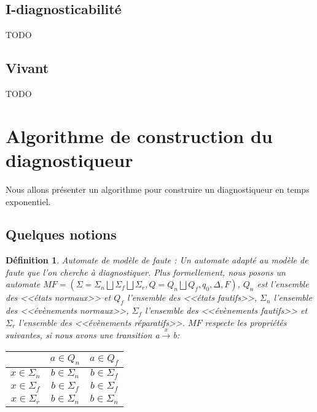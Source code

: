 \documentclass[10pt,a4paper]{article}
\newtheorem {mydef} {D\'efinition}
\begin{document}
\subsection{I-diagnosticabilit\'e}

TODO

\subsection{Vivant}

TODO

\section{Algorithme de construction du diagnostiqueur}
    Nous allons présenter un algorithme pour construire un diagnostiqueur en temps exponentiel.
        \subsection{Quelques notions}
   \begin{mydef}{Automate de mod\`ele de faute : }
                Un automate adapté au modèle de faute que l'on cherche à diagnostiquer. Plus formellement, nous posons un automate $MF = (\Sigma = \Sigma_n \bigsqcup \Sigma_f \bigsqcup \Sigma_r, Q = Q_n \bigsqcup Q_f,q_0,\Delta, F)$,  $Q_n$ est l'ensemble des <<\'etats normaux>> et $Q_f$ l'ensemble des <<\'etats fautifs>>, $\Sigma_n$  l'ensemble des <<\'ev\`enements normaux>>, $\Sigma_f$ l'ensemble des  <<\'ev\`enements fautifs>> et $\Sigma_r$ l'ensemble des <<\'ev\`enements r\'eparatifs>>. $MF$ respecte les propri\'et\'es suivantes, si nous avons une transition a$\xrightarrow{x}$b:
                \begin{center}
                \begin{tabular}{|c|c|c|}
                        \hline
                        & $a\in Q_n$ & $a\in Q_f$\\
                        \hline                        
                        $x\in \Sigma_n$ & $b\in \Sigma_n$&$b\in \Sigma_f$\\
                        \hline                        
                        $x\in \Sigma_f$ &$b\in \Sigma_f$&$b\in \Sigma_f$\\
                        \hline
                        $x\in \Sigma_r$ & $b\in \Sigma_n$ & $b \in \Sigma_n$\\
                        \hline
                \end{tabular}
                \end{center}
    \end{mydef}
    
\end{document}
